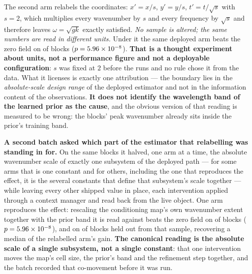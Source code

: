 \documentclass[review]{elsarticle}
\begin{document}
The second arm relabels the coordinates: $x' = x/s$, $y' = y/s$, $t' = t/\sqrt{s}$
with $s = 2$, which multiplies every wavenumber by $s$ and every frequency by
$\sqrt{s}$ and therefore leaves $\omega = \sqrt{gk}$ exactly satisfied. \emph{No
sample is altered; the same numbers are read in different units.} Under it the same
deployed arm beats the zero field on \TElevenRescaleWin{} of \TElevenN{} blocks
($p = 5.96\times 10^{-8}{}$). \textbf{That is a thought experiment about units, not a
performance figure and not a deployable configuration}: $s$ was fixed at $2$ before
the runs and no rule chose it from the data. What it licenses is exactly one
attribution --- the boundary lies in the \emph{absolute-scale design range} of the
deployed estimator and not in the information content of the observations.
\textbf{It does not identify the wavelength band of the learned prior as the cause},
and the obvious version of that reading is measured to be wrong: the blocks' peak
wavenumber already sits inside the prior's training band.

\textbf{A second batch asked which part of the estimator that relabelling was
standing in for.} On the same \TTwelveN{} blocks it halved, one arm at a time, the
absolute wavenumber scale of exactly one subsystem of the deployed path --- for some
arms that is one constant and for others, including the one that reproduces the
effect, it is the several constants that define that subsystem's scale together ---
while leaving every other shipped value in place, each intervention applied through a
context manager and read back from the live object. One arm reproduces the effect: rescaling the conditioning
map's own wavenumber extent together with the prior band it is read against beats
the zero field on \TTwelveWin{} of \TTwelveN{} blocks ($p = 5.96\times 10^{-8}{}$), and on
\TTwelveHeldWin{} of \TTwelveHeldN{} blocks held out from that sample, recovering a
median \TTwelveRho{} of the relabelled arm's gain. \textbf{The canonical reading is
the absolute scale of a single subsystem, not a single constant}: that one
intervention moves the map's cell size, the prior's band and the refinement step
together, and the batch recorded that co-movement before it was run.
\end{document}
